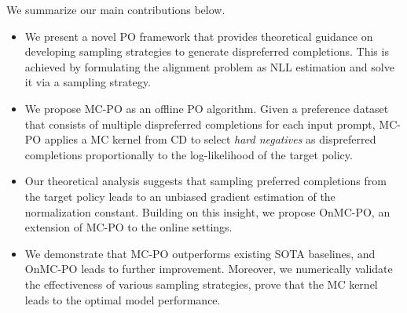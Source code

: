 We summarize our main contributions below.
\begin{itemize}
    \item 
    We present a novel PO framework that provides theoretical guidance on developing sampling strategies to generate dispreferred completions.
    This is achieved by formulating the alignment problem as NLL estimation and solve it via a sampling strategy.
    \item 
    We propose MC-PO as an offline PO algorithm.
    Given a preference dataset that consists of multiple dispreferred completions for each input prompt,
    MC-PO applies a MC kernel from CD to select \textit{hard negatives} as dispreferred completions proportionally to the log-likelihood of the target policy.
    \item
    Our theoretical analysis suggests that sampling preferred completions from the target policy leads to an unbiased gradient estimation of the normalization constant. 
    Building on this insight, we propose OnMC-PO, an extension of MC-PO to the online settings.
    \item 
    We demonstrate that MC-PO outperforms existing SOTA baselines, and OnMC-PO leads to further improvement.
    Moreover, we numerically validate the effectiveness of various sampling strategies, prove that the MC kernel leads to the optimal model performance.
\end{itemize}



